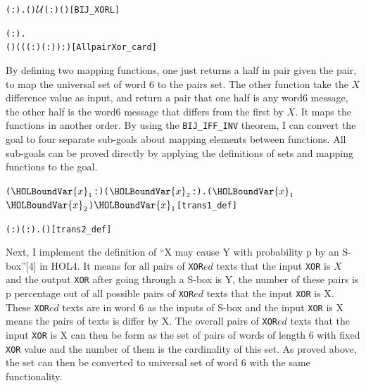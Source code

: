\documentclass{article}
\begin{document}
\begin{alltt}
  \HOLTokenTurnstile{} \HOLSymConst{\HOLTokenForall{}}( :).  ( ) \ensuremath{{\cal{U}}}(:) ( )\hfill{[BIJ_XORL]}
\end{alltt}

\begin{alltt}
  \HOLTokenTurnstile{} \HOLSymConst{\HOLTokenForall{}}( :).
      ( ) \HOLSymConst{=} ((( :) \HOLSymConst{\HOLTokenExp{}} ( :)) :)\hfill{[AllpairXor_card]}
\end{alltt}

By defining two mapping functions, one just returns a half in pair given the pair, to map the universal set of word 6 to
the pairs set. The other function take the $X$ difference value as input, and return a pair that one half is any word6 message,
the other half is the word6 message that differs from the first by $X$. It maps the functions in another order. By using
the \verb|BIJ_IFF_INV| theorem, I can convert the goal to four separate sub-goals about mapping elements between functions.
All sub-goals can be proved directly by applying the definitions of sets and mapping functions to the goal.

\begin{alltt}
  \HOLTokenTurnstile{} \HOLSymConst{\HOLTokenForall{}}(\ensuremath{\HOLBoundVar{x}\sb{\mathrm{1}}} :) (\ensuremath{\HOLBoundVar{x}\sb{\mathrm{2}}} :).  (\ensuremath{\HOLBoundVar{x}\sb{\mathrm{1}}}\HOLSymConst{,}\ensuremath{\HOLBoundVar{x}\sb{\mathrm{2}}}) \HOLSymConst{=} \ensuremath{\HOLBoundVar{x}\sb{\mathrm{1}}}\hfill{[trans1_def]}
\end{alltt}

\begin{alltt}
  \HOLTokenTurnstile{} \HOLSymConst{\HOLTokenForall{}}( :) ( :).    \HOLSymConst{=} (\HOLSymConst{,} \HOLSymConst{\HOLTokenEor{}} )\hfill{[trans2_def]}
\end{alltt}

Next, I implement the definition of ``X may cause Y with probability p by an S-box''[4] in HOL4. It means for all
pairs of \verb|XOR|$ed$ texts that the input \verb|XOR| is $X$ and the output \verb|XOR| after going through a S-box is Y, the number
of these pairs is p percentage out of all possible pairs of \verb|XOR|$ed$ texts that the input \verb|XOR| is X.
These \verb|XOR|$ed$ texts are in word 6 as the inputs of S-box and the input \verb|XOR| is X means the pairs of
texts is differ by X. The overall pairs of \verb|XOR|$ed$ texts that the input \verb|XOR| is X can then be form as the set of pairs
of words of length 6 with fixed \verb|XOR| value and the number of them is the cardinality of this set. As proved above,
the set can then be converted to universal set of word 6 with the same functionality.
\end{document}
